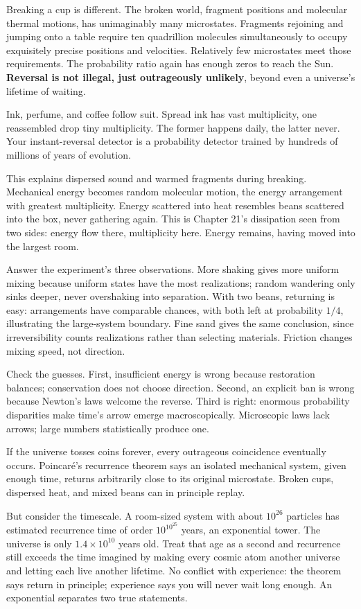 Breaking a cup is different. The broken world, fragment positions and molecular thermal motions, has unimaginably many microstates. Fragments rejoining and jumping onto a table require ten quadrillion molecules simultaneously to occupy exquisitely precise positions and velocities. Relatively few microstates meet those requirements. The probability ratio again has enough zeros to reach the Sun. \textbf{Reversal is not illegal, just outrageously unlikely}, beyond even a universe's lifetime of waiting.

Ink, perfume, and coffee follow suit. Spread ink has vast multiplicity, one reassembled drop tiny multiplicity. The former happens daily, the latter never. Your instant-reversal detector is a probability detector trained by hundreds of millions of years of evolution.

This explains dispersed sound and warmed fragments during breaking. Mechanical energy becomes random molecular motion, the energy arrangement with greatest multiplicity. Energy scattered into heat resembles beans scattered into the box, never gathering again. This is Chapter 21's dissipation seen from two sides: energy flow there, multiplicity here. Energy remains, having moved into the largest room.

Answer the experiment's three observations. More shaking gives more uniform mixing because uniform states have the most realizations; random wandering only sinks deeper, never overshaking into separation. With two beans, returning is easy: arrangements have comparable chances, with both left at probability \(1/4\), illustrating the large-system boundary. Fine sand gives the same conclusion, since irreversibility counts realizations rather than selecting materials. Friction changes mixing speed, not direction.

Check the guesses. First, insufficient energy is wrong because restoration balances; conservation does not choose direction. Second, an explicit ban is wrong because Newton's laws welcome the reverse. Third is right: enormous probability disparities make time's arrow emerge macroscopically. Microscopic laws lack arrows; large numbers statistically produce one.


\begin{thought}
If the universe tosses coins forever, every outrageous coincidence eventually occurs. Poincaré's recurrence theorem says an isolated mechanical system, given enough time, returns arbitrarily close to its original microstate. Broken cups, dispersed heat, and mixed beans can in principle replay.

But consider the timescale. A room-sized system with about \(10^{26}\) particles has estimated recurrence time of order \(10^{10^{25}}\) years, an exponential tower. The universe is only \(1.4\times10^{10}\) years old. Treat that age as a second and recurrence still exceeds the time imagined by making every cosmic atom another universe and letting each live another lifetime. No conflict with experience: the theorem says return in principle; experience says you will never wait long enough. An exponential separates two true statements.
\end{thought}

